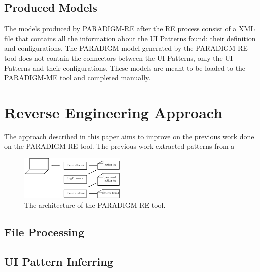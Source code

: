 \documentclass[conference]{IEEEtran}
\begin{document}
\subsection{Produced Models}

The models produced by PARADIGM-RE after the RE process consist of a XML file that contains all the information about the UI Patterns found: their definition and configurations. The PARADIGM model generated by the PARADIGM-RE tool does not contain the connectors between the UI Patterns, only the UI Patterns and their configurations. These models are meant to be loaded to the PARADIGM-ME tool and completed manually.\\

\section{Reverse Engineering Approach}\label{sec:re}
The  approach described in this paper aims to improve on the previous work \cite{nabuco2013inferring} done on the PARADIGM-RE tool. The previous work extracted patterns from a


\begin{figure}[!htb]
\centering
\includegraphics[width=0.45\textwidth]{retool}
\caption{The architecture of the PARADIGM-RE tool.}
\label{fig:retool}
\end{figure}

\subsection{File Processing}\label{sec:fp}

\subsection{UI Pattern Inferring}\label{sec:inf}
\end{document}
